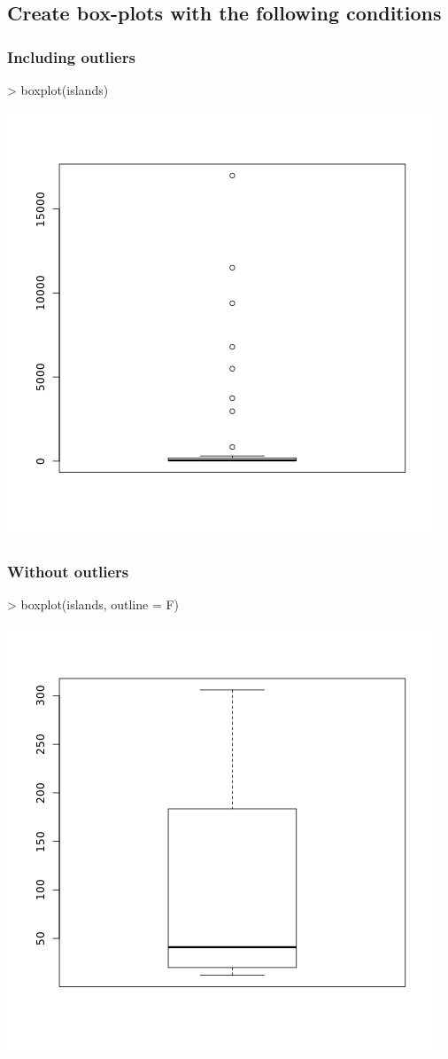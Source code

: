 \documentclass[a4paper,11pt]{article}
\begin{document}
\subsection{Create box-plots with the following conditions}
\subsubsection{Including outliers}
\begin{rcode}
> boxplot(islands)
\end{rcode}
\includegraphics{boxplot}
\subsubsection{Without outliers}
\begin{rcode}
> boxplot(islands, outline = F)
\end{rcode}
\includegraphics{boxplot-2}
\end{document}
